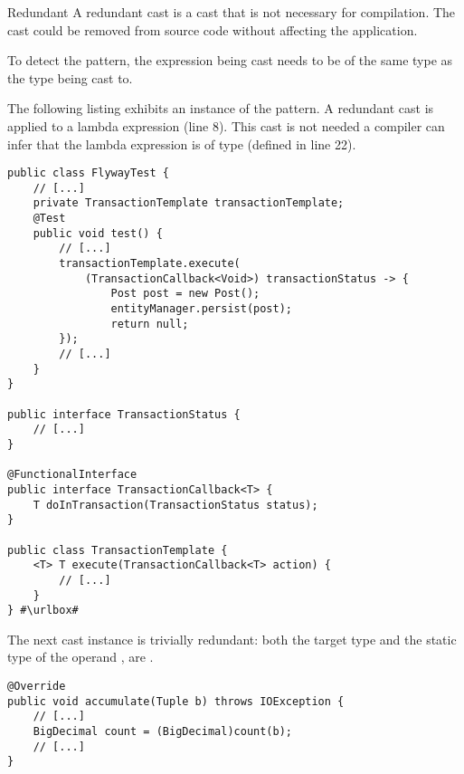 \begin{pattern}{Redundant}
A redundant cast is a cast that is not necessary for compilation.
The cast could be removed from source code without affecting the application.

To detect the \thisp{} pattern, 
the expression being cast needs to be of the same type as the type being cast to.

\instances{}
%
The following listing%
\def\urlvar{http://bit.ly/vladmihalcea_high_performance_java_persistence_2FWXw2e}
exhibits an instance of the \thisp{} pattern.
A redundant cast is applied to a lambda expression (line 8).
This cast is not needed a \java{} compiler can infer that the lambda expression is of type  (defined in line 22).

\begin{verbatim}
public class FlywayTest {
    // [...]
    private TransactionTemplate transactionTemplate;
    @Test
    public void test() {
        // [...]
        transactionTemplate.execute(
            (TransactionCallback<Void>) transactionStatus -> {
                Post post = new Post();
                entityManager.persist(post);
                return null;
        });
        // [...]
    }
}

public interface TransactionStatus {
    // [...]
}

@FunctionalInterface
public interface TransactionCallback<T> {	
	T doInTransaction(TransactionStatus status);
}

public class TransactionTemplate {
	<T> T execute(TransactionCallback<T> action) {
        // [...]
	}
} #\urlbox#
\end{verbatim}

The next cast instance%
\def\urlvar{http://bit.ly/sigmoidanalytics_spork_2SIqWYq}
is trivially redundant: both the target type and the static type of the
  operand ,
  are .

\begin{verbatim}
@Override
public void accumulate(Tuple b) throws IOException {
    // [...]
    BigDecimal count = (BigDecimal)count(b);
    // [...]
}


\end{verbatim}
\end{pattern}
